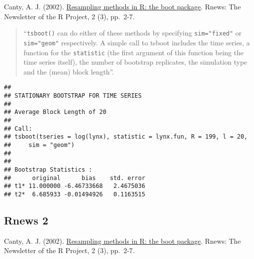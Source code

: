 \documentclass[]{book}
\newenvironment{Shaded}{\begin{snugshade}}{\end{snugshade}}
\newcommand{\KeywordTok}[1]{\textcolor[rgb]{0.13,0.29,0.53}{\textbf{#1}}}
\newcommand{\DataTypeTok}[1]{\textcolor[rgb]{0.13,0.29,0.53}{#1}}
\newcommand{\DecValTok}[1]{\textcolor[rgb]{0.00,0.00,0.81}{#1}}
\newcommand{\StringTok}[1]{\textcolor[rgb]{0.31,0.60,0.02}{#1}}
\newcommand{\CommentTok}[1]{\textcolor[rgb]{0.56,0.35,0.01}{\textit{#1}}}
\newcommand{\ControlFlowTok}[1]{\textcolor[rgb]{0.13,0.29,0.53}{\textbf{#1}}}
\newcommand{\OperatorTok}[1]{\textcolor[rgb]{0.81,0.36,0.00}{\textbf{#1}}}
\newcommand{\NormalTok}[1]{#1}
\theoremstyle{break}
\theoremstyle{definition}
\theoremstyle{definition}
\theoremstyle{definition}
\theoremstyle{remark}
\begin{document}
Canty, A. J. (2002).
\href{http://cran.fhcrc.org/doc/Rnews/Rnews_2002-3.pdf}{Resampling
methods in R: the boot package}. Rnews: The Newsletter of the R Project,
2 (3), pp.~2-7.

\begin{quote}
``\texttt{tsboot()} can do either of these methods by specifying
\texttt{sim="fixed"} or \texttt{sim="geom"} respectively. A simple call
to tsboot includes the time series, a function for the
\texttt{statistic} (the first argument of this function being the time
series itself), the number of bootstrap replicates, the simulation type
and the (mean) block length''.
\end{quote}

\begin{Shaded}
\end{Shaded}

\begin{verbatim}
## 
## STATIONARY BOOTSTRAP FOR TIME SERIES
## 
## Average Block Length of 20 
## 
## Call:
## tsboot(tseries = log(lynx), statistic = lynx.fun, R = 199, l = 20, 
##     sim = "geom")
## 
## 
## Bootstrap Statistics :
##      original      bias    std. error
## t1* 11.000000 -6.46733668   2.4675036
## t2*  6.685933 -0.01494926   0.1163515
\end{verbatim}

\subsection{Rnews 2}\label{rnews-2}

Canty, A. J. (2002).
\href{http://cran.fhcrc.org/doc/Rnews/Rnews_2002-3.pdf}{Resampling
methods in R: the boot package}. Rnews: The Newsletter of the R Project,
2 (3), pp.~2-7.
\end{document}
